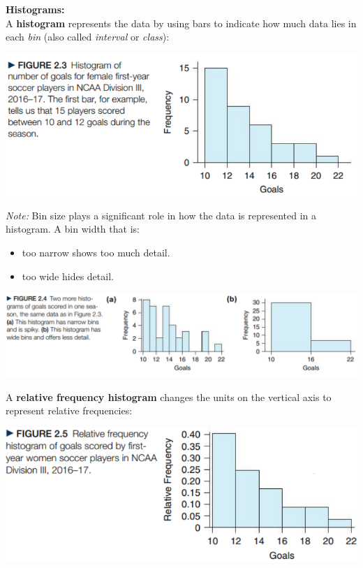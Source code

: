 \documentclass[../mathNotesPreamble]{subfiles}
\begin{document}
  {\noindent\Large\textbf{Histograms:}\\}
  \noindent
  A \textbf{histogram} represents the data by using bars to indicate how much data lies in each \emph{bin} (also called \emph{interval} or \emph{class}):
  \begin{center}
    \includegraphics[width=0.65\linewidth]{images/math211_figure_2p03}
  \end{center}
  \pagebreak
  
  \emph{Note:} Bin size plays a significant role in how the data is represented in a histogram. A bin width that is:
  \begin{itemize}
    \item too narrow shows too much detail.
    \item too wide hides detail.
  \end{itemize}
  \begin{center}
    \includegraphics[width=0.85\linewidth]{images/math211_figure_2p04}
  \end{center}
  A \textbf{relative frequency histogram} changes the units on the vertical axis to represent relative frequencies:
  \begin{center}
    \includegraphics[width=0.65\linewidth]{images/math211_figure_2p05}
  \end{center}
  \pagebreak
  
\end{document}
